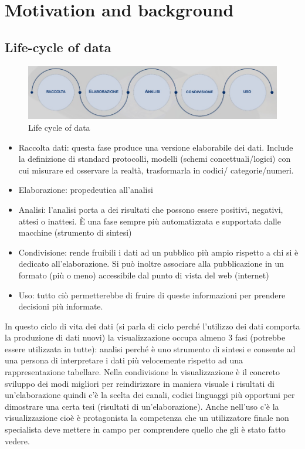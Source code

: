 \documentclass[12pt,a4paper]{report}
\begin{document}
	
	\tableofcontents
	\cleardoublepage
	
	\chapter{Motivation and background}


\section{Life-cycle of data}

\begin{figure}[h]
	\centering
	\includegraphics[width=1\linewidth]{imgs datavis/Life cycle.png}
	\caption{Life cycle of data}
	\label{fig:cycle}
\end{figure}

\begin{itemize}
	\item Raccolta dati: questa fase produce una versione elaborabile dei dati. Include la definizione di standard protocolli, modelli (schemi concettuali/logici) con cui misurare ed osservare la realtà, trasformarla in codici/ categorie/numeri.
	\item 	Elaborazione: propedeutica all'analisi
	\item Analisi: l'analisi porta a dei risultati che possono essere positivi, negativi, attesi o inattesi. \`E una fase sempre più automatizzata e supportata dalle macchine (strumento di sintesi)
	\item Condivisione: rende fruibili i dati ad un pubblico più ampio rispetto a chi si è dedicato all'elaborazione. Si può inoltre associare alla pubblicazione in un formato (più o meno) accessibile dal punto di vista del web (internet)
	\item 	Uso: tutto ciò permetterebbe di fruire di queste informazioni per prendere decisioni più informate.
\end{itemize}


In questo ciclo di vita dei dati (si parla di ciclo perché l'utilizzo dei dati comporta la produzione di dati nuovi) la visualizzazione occupa almeno 3 fasi (potrebbe essere utilizzata in tutte): analisi perché è uno strumento di sintesi e consente ad una persona di interpretare i dati più velocemente rispetto ad una rappresentazione tabellare. Nella condivisione la visualizzazione è il concreto sviluppo dei modi migliori per reindirizzare in maniera visuale i risultati di un'elaborazione quindi c'è la scelta dei canali, codici linguaggi più opportuni per dimostrare una certa tesi (risultati di un'elaborazione). Anche nell'uso c'è la visualizzazione cioè è protagonista la competenza che un utilizzatore finale non specialista deve mettere in campo per comprendere quello che gli è stato fatto vedere.
\end{document}
